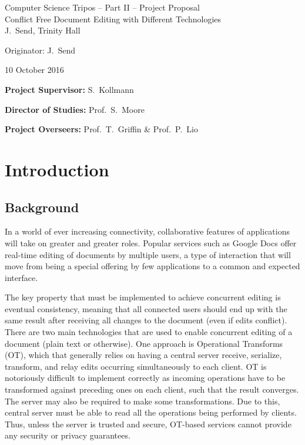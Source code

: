 \documentclass[12pt,a4paper,twoside]{article}
\begin{document}
\begin{center}
\Large
Computer Science Tripos -- Part II -- Project Proposal\\[4mm]
\LARGE
Conflict Free Document Editing with Different Technologies\\[4mm]

\large
J.~Send, Trinity Hall

Originator: J.~Send

10 October 2016
\end{center}

\vspace{5mm}

\textbf{Project Supervisor:} S.~Kollmann

\textbf{Director of Studies:} Prof.~S.~Moore

\textbf{Project Overseers:} Prof.~T.~Griffin \& Prof.~P.~Lio


\section*{Introduction}

\subsection*{Background}

In a world of ever increasing connectivity, collaborative features of applications
will take on greater and greater roles. Popular services such as Google Docs offer real-time
editing of documents by multiple users, a type of interaction that will move from being
a special offering by few applications to a common and expected interface.

The key property that must be implemented to achieve concurrent editing is eventual consistency,
meaning that all connected users should end up with the same result after receiving all changes to the document 
(even if edits conflict). There are two main technologies that are used to enable concurrent editing of a 
document (plain text or otherwise). One approach is Operational Transforms (OT), 
which that generally relies  on having a central server receive, serialize, transform, and 
relay edits occurring simultaneously to each client. OT is notoriously difficult to implement 
correctly as incoming operations have to be transformed against preceding ones on each client, 
such that the result converges. The server may also be required to make some transformations. 
Due to this, central server must be able to read all the operations being performed by clients.
Thus, unless the server is trusted and secure, OT-based services cannot provide any security or privacy guarantees. 
\end{document}

